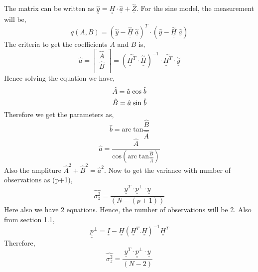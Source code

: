 \noindent The matrix can be written as $\underline{\overset{\sim}{y}} = \underline{\underline{H}} \cdot \underline{\overset{\sim}{a}} + \underline{\overset{\sim}{Z}}$. For the sine model, the measurement will be,
$$ q(A,B) = (\overset{\sim}{y} - \underline{\underline{\overset{\sim}{H}}}\; \underline{\overset{\sim}{a}})^T \cdot (\overset{\sim}{y} - \underline{\underline{\overset{\sim}{H}}}\; \underline{\overset{\sim}{a}})$$
\noindent The criteria to get the coefficients $A$ and $B$ is,
\[
{\underline{\hat{a}}} =
\begin{bmatrix}
\hat{A} \\
\hat{B} \\
\end{bmatrix}
=
(  \overset{\sim}{\underline{\underline{H}}^T}   \cdot \overset{\sim}{\underline{\underline{H}}})^{-1} \cdot  \overset{\sim}{\underline{\underline{H}}^T} \cdot \underline{\overset{\sim}{y}}
\]
\noindent Hence solving the equation we have,
$$ \hat{A} = \hat{a}\;\text{cos}\;\hat{b}\\$$
$$ \hat{B} = \hat{a}\;\text{sin}\;\hat{b}\\$$
\noindent Therefore we get the parameters as,
$$\hat{b} = \text{arc}\;\text{tan}\frac{\hat{B}}{\hat{A}}$$
$$\hat{a} = \frac{\hat{A}}{\text{cos}(\text{arc}\;\text{tan}\frac{\hat{B}}{\hat{A}})}$$
\noindent Also the ampliture ${\hat{A}}^2 + {\hat{B}}^2 = {\hat{a}}^2$. Now to get the variance with number of observations as (p+1),
$$\hat{\sigma_z^2} = \frac{\underline{y}^T\cdot \underline{\underline{p}}^{\bot}\cdot \underline{y}}{(N- (p+1))}$$
\noindent Here also we have 2 equations. Hence, the number of observations will be 2. Also from section 1.1,
$$\underline{\underline{p}}^{\bot} = \underline{\underline{I}} - \underline{\underline{H}}(\underline{\underline{H}}^T.\underline{\underline{H}})^{-1}\underline{\underline{H}}^T$$
\noindent Therefore,
$$\hat{\sigma_z^2} = \frac{\underline{y}^T\cdot \underline{\underline{p}}^{\bot}\cdot \underline{y}}{(N-2)}$$



